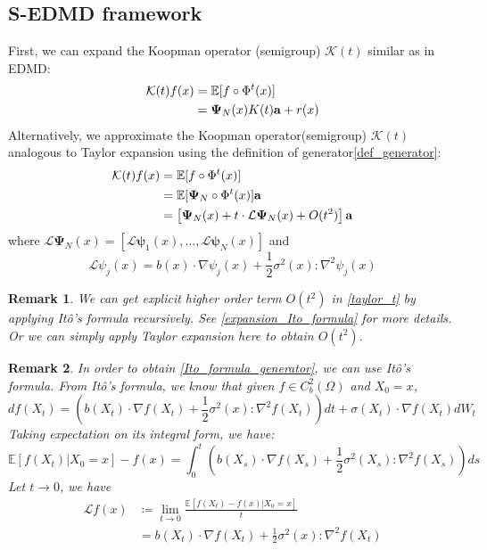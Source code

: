 \documentclass{article}[11]
\newtheorem*{remark}{Remark}
\begin{document}
	\subsection*{S-EDMD framework}
	First, we can expand the Koopman operator (semigroup) $\mathcal{K}(t)$ similar as in EDMD:
	\begin{align}\label{edmd_expansion}
		\mathcal{K}(t) f(x) 
		&= \mathbb{E}[f\circ\Phi^{t}(x)] \notag\\
		&= \mathbf{\Psi}_N(x)K(t)\mathbf{a} + r(x) 
	\end{align}
	Alternatively, we approximate the Koopman operator(semigroup) $\mathcal{K}(t)$ analogous to Taylor expansion using the definition of generator\eqref{def_generator}:
	\begin{align}\label{taylor_t}
		\mathcal{K}(t)f(x) &= \mathbb{E}[f\circ\Phi^{t}(x)] \notag\\
		&= \mathbb{E}[\mathbf{\Psi}_N\circ\Phi^{t}(x)]\mathbf{a} \notag\\
		&= \left[ \mathbf{\Psi}_N(x) + t \cdot \mathcal{L}\mathbf{\Psi}_N(x) + O(t^2)  \right]\mathbf{a}
	\end{align}
	where $\mathcal{L}\mathbf{\Psi}_N(x) = \left[ \mathcal{L}\mathbf{\psi}_1(x), \dots, \mathcal{L}\mathbf{\psi}_N(x) \right]$ and
	\begin{equation}\label{Ito_formula_generator}
		\mathcal{L}\psi_j(x) = b(x)\cdot \nabla\psi_j(x) + \frac{1}{2}\sigma^2(x)\colon \nabla^2 \psi_j(x)
	\end{equation}
	\begin{remark}
		We can get explicit higher order term $O(t^2)$ in \eqref{taylor_t} by applying It\^{o}'s formula recursively. See \ref{expansion_Ito_formula} for more details. Or we can simply apply Taylor expansion here to obtain $O(t^2)$.
	\end{remark}
	\begin{remark}
		In order to obtain \eqref{Ito_formula_generator}, we can use It\^{o}'s formula. From It\^{o}'s formula, we know that given $f\in C_b^2(\Omega)$ and $X_0=x$,
		$$ df(X_t) = \left(b(X_t)\cdot \nabla f(X_t) + \frac{1}{2}\sigma^2(x)\colon \nabla^2 f(X_t)\right)dt + \sigma(X_t)\cdot \nabla f(X_t)dW_t $$
		Taking expectation on its integral form, we have: 
		$$\mathbb{E}[f(X_t)|X_0=x]-f(x) = \int_0^t \left( b(X_s)\cdot \nabla f(X_s) + \frac{1}{2}\sigma^2(X_s)\colon \nabla^2 f(X_s) \right) ds$$
		Let $t \to 0$, we have
		\begin{align*}
			\mathcal{L}f(x) &\coloneqq \lim_{t \to 0} \frac{\mathbb{E}[f(X_t)-f(x)|X_0=x]}{t} \\
			&= b(X_t)\cdot \nabla f(X_t) + \frac{1}{2}\sigma^2(x)\colon \nabla^2 f(X_t)
		\end{align*}
	\end{remark}
\end{document}
